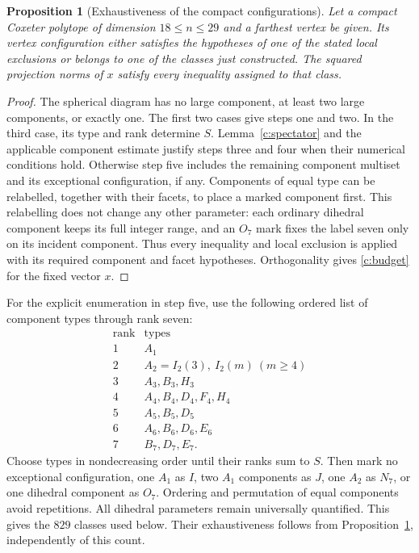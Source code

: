 \documentclass[11pt]{article}
\newtheorem{proposition}[theorem]{Proposition}
\theoremstyle{definition}
\theoremstyle{remark}
\numberwithin{equation}{section}
\begin{document}
\begin{proposition}[Exhaustiveness of the compact configurations]
\label{c:complete-cover}
Let a compact Coxeter polytope of dimension $18\le n\le29$ and a
farthest vertex be given. Its vertex configuration either satisfies
the hypotheses of one of the stated local exclusions or belongs to
one of the classes just constructed. The squared projection norms
of $x$ satisfy every inequality assigned to that class.
\end{proposition}
\begin{proof}
The spherical diagram has no large component, at least two large
components, or exactly one. The first two cases give steps one and
two. In the third case, its type and rank determine $S$.
Lemma~\ref{c:spectator} and the applicable component estimate justify
steps three and four when their numerical conditions hold.
Otherwise step five includes the remaining component multiset and
its exceptional configuration, if any. Components of equal type can
be relabelled, together with their facets, to place a marked component
first. This relabelling does not change any other parameter: each
ordinary dihedral component keeps its full integer range, and an
$O_7$ mark fixes the label seven only on its incident component.
Thus every inequality and local exclusion is applied with its required
component and facet hypotheses. Orthogonality gives
\eqref{c:budget} for the fixed vector $x$.
\end{proof}

For the explicit enumeration in step five, use the following ordered
list of component types through rank seven:
\[
\begin{array}{c|l}
\text{rank}&\text{types}\\\hline
1&A_1\\
2&A_2=I_2(3),\ I_2(m)\ (m\ge4)\\
3&A_3,B_3,H_3\\
4&A_4,B_4,D_4,F_4,H_4\\
5&A_5,B_5,D_5\\
6&A_6,B_6,D_6,E_6\\
7&B_7,D_7,E_7.
\end{array}
\]
Choose types in nondecreasing order until their ranks sum to $S$.
Then mark no exceptional configuration, one $A_1$ as $I$, two $A_1$
components as $J$, one $A_2$ as $N_7$, or one dihedral component as
$O_7$. Ordering and permutation of equal components avoid repetitions.
All dihedral parameters remain universally quantified. This gives the
$829$ classes used below. Their exhaustiveness follows from
Proposition~\ref{c:complete-cover}, independently of this count.
\end{document}
